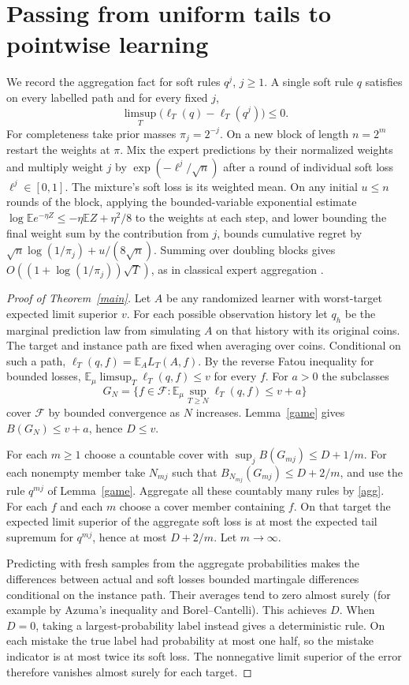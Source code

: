 \documentclass[11pt]{article}
\newcommand{\E}{\mathbb E}
\newcommand{\F}{\mathcal F}
\begin{document}
\section{Passing from uniform tails to pointwise learning}
We record the aggregation fact for soft rules $q^j$, $j\ge1$. A single soft rule $q$ satisfies on every labelled path and for every fixed $j$,
\begin{equation}\label{agg}
 \limsup_T\big(\ell_T(q)-\ell_T(q^j)\big)\le0.
\end{equation}
For completeness take prior masses $\pi_j=2^{-j}$. On a new block of length $n=2^m$ restart the weights at $\pi$. Mix the expert predictions by their normalized weights and multiply weight $j$ by $\exp(-\ell^j/\sqrt n)$ after a round of individual soft loss $\ell^j\in[0,1]$. The mixture's soft loss is its weighted mean. On any initial $u\le n$ rounds of the block, applying the bounded-variable exponential estimate $\log\E e^{-\eta Z}\le-\eta\E Z+\eta^2/8$ to the weights at each step, and lower bounding the final weight sum by the contribution from $j$, bounds cumulative regret by $\sqrt n\log(1/\pi_j)+u/(8\sqrt n)$. Summing over doubling blocks gives $O((1+\log(1/\pi_j))\sqrt T)$, as in classical expert aggregation \cite{expert}.

\begin{proof}[Proof of Theorem~\ref{main}]
Let $A$ be any randomized learner with worst-target expected limit superior $v$. For each possible observation history let $q_h$ be the marginal prediction law from simulating $A$ on that history with its original coins. The target and instance path are fixed when averaging over coins. Conditional on such a path, $\ell_T(q,f)=\E_A L_T(A,f)$. By the reverse Fatou inequality for bounded losses, $\E_\mu\limsup_T\ell_T(q,f)\le v$ for every $f$. For $a>0$ the subclasses
\[
 G_N=\{f\in\F:\E_\mu\sup_{T\ge N}\ell_T(q,f)\le v+a\}
\]
cover $\F$ by bounded convergence as $N$ increases. Lemma~\ref{game} gives $B(G_N)\le v+a$, hence $D\le v$.

For each $m\ge1$ choose a countable cover with $\sup_j B(G_{mj})\le D+1/m$. For each nonempty member take $N_{mj}$ such that $B_{N_{mj}}(G_{mj})\le D+2/m$, and use the rule $q^{mj}$ of Lemma~\ref{game}. Aggregate all these countably many rules by \eqref{agg}. For each $f$ and each $m$ choose a cover member containing $f$. On that target the expected limit superior of the aggregate soft loss is at most the expected tail supremum for $q^{mj}$, hence at most $D+2/m$. Let $m\to\infty$.

Predicting with fresh samples from the aggregate probabilities makes the differences between actual and soft losses bounded martingale differences conditional on the instance path. Their averages tend to zero almost surely (for example by Azuma's inequality and Borel--Cantelli). This achieves $D$. When $D=0$, taking a largest-probability label instead gives a deterministic rule. On each mistake the true label had probability at most one half, so the mistake indicator is at most twice its soft loss. The nonnegative limit superior of the error therefore vanishes almost surely for each target.
\end{proof}
\end{document}
